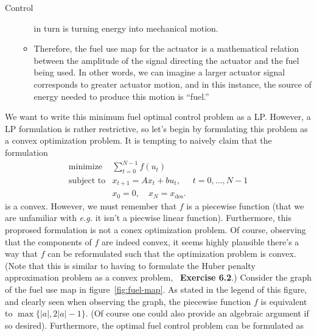 \begin{chapter}{Control}
\begin{itemize}
\begin{itemize}
                    in turn is turning energy into mechanical motion.
                    \item Therefore, the fuel use map for the actuator is a mathematical
                    relation between the amplitude of the signal directing the actuator and
                    the fuel being used. In other words, we can imagine a larger actuator
                    signal corresponds to greater actuator motion, and in this instance,
                    the source of energy needed to produce this motion is ``fuel.''
                \end{itemize}
        \end{itemize}
     We want to write this minimum
     fuel optimal control problem as a LP. However, a LP formulation is rather restrictive,
     so let's begin by formulating this problem as a convex optimization problem. It is tempting
     to naively claim that the formulation
    \[\begin{array}{lll}
    \text{minimize} \; & \sum_{t=0}^{N-1} f(u_t) & \\
    \text{subject to} & x_{t+1} = Ax_t + bu_t, \; & t=0, \ldots, N-1 \\
    & x_0 = 0, \quad x_{N} = x_{\text{des}}.
    \end{array}\]
    is a convex. However, we must remember that $f$ is a piecewise function (that we are unfamiliar with \textit{e.g.}
    it isn't a piecwise linear function). Furthermore, this proprosed formulation is not a conex optimization
    problem. Of course, observing that the components of $f$ are indeed convex, it seems highly
    plausible there's a way that $f$ can be reformulated such that the optimization problem is convex.
    (Note that this is similar to having to formulate the Huber penalty approximation problem
    as a convex problem,~\cite{boyd_convex_optimization} \textbf{Exercise 6.2}.)
    Consider the graph of the fuel use map in figure~\ref{fig:fuel-map}. As stated in the legend of this figure,
    and clearly seen when observing the graph,
    the piecewise function $f$ is equivalent to $\max\{\left| a \right|, 2 \left| a \right| - 1\}$.
    (Of course one could also provide an algebraic argument if so desired). Furthermore, 
    the optimal fuel control problem can be formulated as


\end{chapter}
